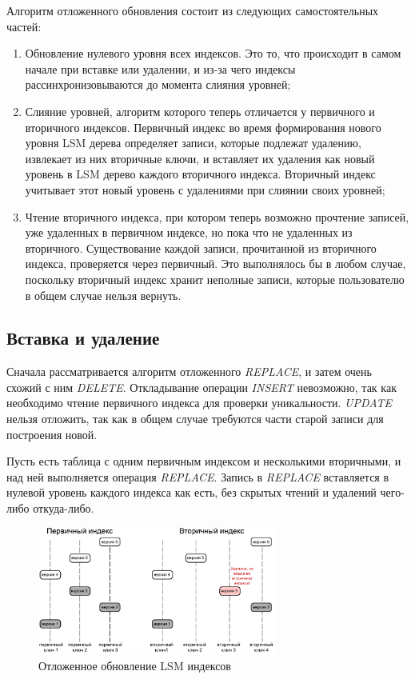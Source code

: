 \documentclass[a4paper,hidelinks,12pt]{article}
\begin{document}
Алгоритм отложенного обновления состоит из следующих самостоятельных частей:
\begin{enumerate}
\item Обновление нулевого уровня всех индексов. Это то, что происходит в самом
начале при вставке или удалении, и из-за чего индексы рассинхронизовываются до
момента слияния уровней;
\item Слияние уровней, алгоритм которого теперь отличается у первичного и
вторичного индексов. Первичный индекс во время формирования нового уровня LSM
дерева определяет записи, которые подлежат удалению, извлекает из них вторичные
ключи, и вставляет их удаления как новый уровень в LSM дерево каждого вторичного
индекса. Вторичный индекс учитывает этот новый уровень с удалениями при слиянии
своих уровней;
\item Чтение вторичного индекса, при котором теперь возможно прочтение записей,
уже удаленных в первичном индексе, но пока что не удаленных из вторичного.
Существование каждой записи, прочитанной из вторичного индекса, проверяется
через первичный. Это выполнялось бы в любом случае, поскольку вторичный индекс
хранит неполные записи, которые пользователю в общем случае нельзя вернуть.
\end{enumerate}

\subsection{Вставка и удаление}
Сначала рассматривается алгоритм отложенного \textit{REPLACE}, и затем очень
схожий с ним \textit{DELETE}. Откладывание операции \textit{INSERT} невозможно,
так как необходимо чтение первичного индекса для проверки уникальности.
\textit{UPDATE} нельзя отложить, так как в общем случае требуются части старой
записи для построения новой.

Пусть есть таблица с одним первичным индексом и несколькими вторичными, и над
ней выполняется операция \textit{REPLACE}. Запись в \textit{REPLACE} вставляется
в нулевой уровень каждого индекса как есть, без скрытых чтений и удалений
чего-либо откуда-либо.

\begin{figure}[h]
\centering
\includegraphics[width=0.7\textwidth]{table_after_deferred_update}
\caption{Отложенное обновление LSM индексов}
\label{fig:table_after_deferred_update}
\end{figure}
\end{document}
